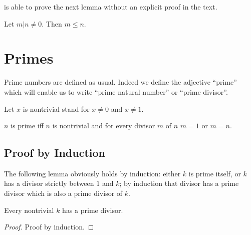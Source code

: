 \documentclass[11pt]{article}
\begin{document}
\Naproche{} is able to prove the next lemma without an
explicit proof in the text.

\begin{forthel}

\begin{lemma} Let $m | n \neq 0$. Then $m \leq n$.
\end{lemma}

\end{forthel}

\section{Primes}

Prime numbers are defined as usual. Indeed we define
the adjective ``prime'' which will enable us
to write ``prime natural number'' or ``prime divisor''.

\begin{forthel}

Let $x$ is nontrivial stand for $x \neq 0$ and $x \neq 1$.

\begin{definition}
$n$ is prime iff $n$ is nontrivial and
    for every divisor $m$ of $n$ $m = 1$ or $m = n$.
\end{definition}

\end{forthel}
\subsection{Proof by Induction}
The following lemma obviously holds by induction: either
$k$ is prime itself, or $k$ has a divisor strictly
between $1$ and $k$; by induction that divisor has a prime
divisor which is also a prime divisor of $k$.

\begin{forthel}

\begin{lemma} Every nontrivial $k$ has a prime divisor.
\end{lemma}
\begin{proof} Proof by induction.
\end{proof}

\end{forthel}
\end{document}
